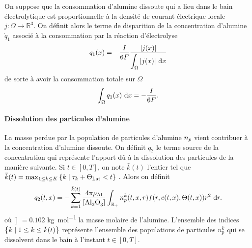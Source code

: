 On suppose que la consommation d'alumine dissoute qui a lieu dans le
bain électrolytique est proportionnelle à la densité de courant
électrique locale $j:\Omega\to\mathbb R^3$. On définit alors le terme
de disparition de la concentration d'alumine $\dot q_1$ associé à la
consommation par la réaction d'électrolyse
\begin{equation}
  q_1(x) = -\frac{I}{6\faraday} %
  \frac{\abs{j(x)}}{\displaystyle\int_\Omega\abs{j(x)}\intd{x}}
\end{equation}
de sorte à avoir la consommation totale sur $\Omega$
\begin{equation}
  \int_\Omega q_1(x)\,\,\mathrm dx = -\frac{I}{6F}.
\end{equation}

\paragraph{Dissolution des particules d'alumine}
La masse perdue par la population de particules d'alumine
$n_p$ vient contribuer à la concentration d'alumine
dissoute. On définit $q_2$ le terme source de la concentration
qui représente l'apport dû à la dissolution des particules de la
manière suivante. Si $t \in [0, T]$, on note $\bar k(t)$ l'entier tel
que $\bar k(t) = \max_{1\leq k\leq K}\left\{ k \mid \tau_k + \Theta_\text{Lat} < t \right\}$ . Alors on définit
\begin{equation}
  q_2(t, x) = -\sum_{k = 1}^{\bar
    k(t)}\frac{4\pi\aluminadensity}{[\ce{Al2O3}]}\int_{\rplus}n_p^k(t,
  x, r)f(r, \concentration(t, x), \temperature(t, x))r^2\,\intd{r}.
\end{equation}
où [] $ = \num{0.102}$ \si{\kilo\gram\per\mol} la masse
molaire de l'alumine. L'ensemble des indices $\left\{ k \mid 1\leq k
  \leq \bar k (t) \right\}$ représente l'ensemble des populations de particules
$n_p^k$ qui se dissolvent dans le bain à l'instant $t\in[0, T]$.

